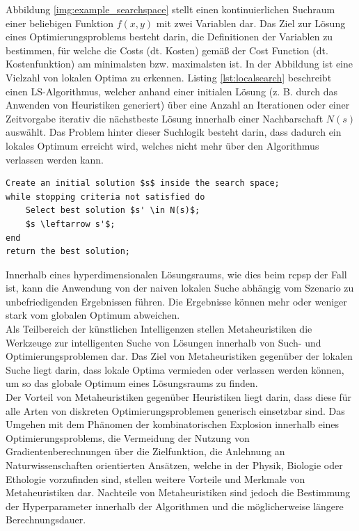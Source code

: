 Abbildung \ref{img:example_searchspace} stellt einen kontinuierlichen Suchraum einer beliebigen Funktion $f(x, y)$ mit zwei Variablen dar. Das Ziel zur Lösung eines Optimierungsproblems besteht darin, die Definitionen der Variablen zu bestimmen, für welche die Costs (dt. Kosten) gemäß der Cost Function (dt. Kostenfunktion) am minimalsten bzw. maximalsten ist. In der Abbildung ist eine Vielzahl von lokalen Optima zu erkennen. Listing \ref{lst:localsearch} beschreibt einen \ac{LS}-Algorithmus, welcher anhand einer initialen Lösung (z. B. durch das Anwenden von Heuristiken generiert) über eine Anzahl an Iterationen oder einer Zeitvorgabe iterativ die nächstbeste Lösung innerhalb einer Nachbarschaft $N(s)$ auswählt. Das Problem hinter dieser Suchlogik besteht darin, dass dadurch ein lokales Optimum erreicht wird, welches nicht mehr über den Algorithmus verlassen werden kann.  \cite[vgl.][S. 3]{mills_survey_2004}

\begin{lstlisting}[caption={{Local Search (LS)}}, label=lst:localsearch, mathescape=truexinputencoding={utf8}, extendedchars=false, escapeinside=``]
Create an initial solution $s$ inside the search space;
while stopping criteria not satisfied do
    Select best solution $s' \in N(s)$;
    $s \leftarrow s'$; 
end
return the best solution;
\end{lstlisting}

Innerhalb eines hyperdimensionalen Lösungsraums, wie dies beim \ac{rcpsp} der Fall ist, kann die Anwendung von der naiven lokalen Suche abhängig vom Szenario zu unbefriedigenden Ergebnissen führen. Die Ergebnisse können mehr oder weniger stark vom globalen Optimum abweichen. \\

Als Teilbereich der künstlichen Intelligenzen stellen Metaheuristiken die Werkzeuge zur intelligenten Suche von Lösungen innerhalb von Such- und Optimierungsproblemen dar. Das Ziel von Metaheuristiken gegenüber der lokalen Suche liegt darin, dass lokale Optima vermieden oder verlassen werden können, um so das globale Optimum eines Lösungsraums zu finden. \cite[vgl.][S. 3]{mills_survey_2004} \\

Der Vorteil von Metaheuristiken gegenüber Heuristiken liegt darin, dass diese für alle Arten von diskreten Optimierungsproblemen generisch einsetzbar sind. Das Umgehen mit dem Phänomen der kombinatorischen Explosion innerhalb eines Optimierungsproblems, die Vermeidung der Nutzung von Gradientenberechnungen über die Zielfunktion, die Anlehnung an Naturwissenschaften orientierten Ansätzen, welche in der Physik, Biologie oder Ethologie vorzufinden sind, stellen weitere Vorteile und Merkmale von Metaheuristiken dar. Nachteile von Metaheuristiken sind jedoch die Bestimmung der Hyperparameter innerhalb der Algorithmen und die möglicherweise längere Berechnungsdauer. \cite[vgl.][S. 2 f.]{mills_survey_2004} \\

